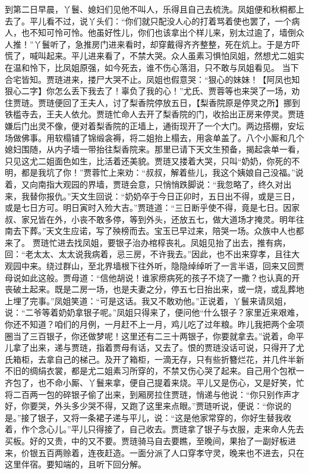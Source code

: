 \documentclass[12pt,oneside]{book}
\begin{document}
到第二日早晨，丫鬟、媳妇们见他不叫人，乐得且自己去梳洗。凤姐便和秋桐都上去了。平儿看不过，说丫头们：“你们就只配没人心的打着骂着使也罢了，一个病人，也不知可怜可怜。他虽好性儿，你们也该拿出个样儿来，别太过逾了，墙倒众人推！”丫鬟听了，急推房门进来看时，却穿戴得齐齐整整，死在炕上。于是方吓慌了，喊叫起来。平儿进来看了，不禁大哭。众人虽素习惧怕凤姐，然想尤二姐实在温和怜下，比凤姐原强，如今死去，谁不伤心落泪，只不敢与凤姐看见。
当下合宅皆知。贾琏进来，搂尸大哭不止。凤姐也假意哭：“狠心的妹妹！【阿凤也知狠心二字】你怎么丢下我去了！辜负了我的心！”尤氏、贾蓉等也来哭了一场，劝住贾琏。贾琏便回了王夫人，讨了梨香院停放五日，【梨香院原是停灵之所】挪到铁槛寺去，王夫人依允。贾琏忙命人去开了梨香院的门，收拾出正房来停灵。贾琏嫌后门出灵不像，便对着梨香院的正墙上，通街现开了一个大门。两边搭棚，安坛场做佛事。用软榻铺了锦缎衾褥，将二姐抬上榻去，用衾单盖了。八个小厮和几个媳妇围随，从内子墙一带抬往梨香院来。那里已请下天文生预备，揭起衾单一看，只见这尤二姐面色如生，比活着还美貌。贾琏又搂着大哭，只叫“奶奶，你死的不明，都是我坑了你！”贾蓉忙上来劝：“叔叔，解着些儿，我这个姨娘自己没福。”说着，又向南指大观园的界墙，贾琏会意，只悄悄跌脚说：“我忽略了，终久对出来，我替你报仇。”天文生回说：“奶奶卒于今日正卯时，五日出不得，或是三日，或是七日方可。明日寅时入殓大吉。”贾琏道：“三日断乎使不得，竟是七日。因家叔、家兄皆在外，小丧不敢多停，等到外头，还放五七，做大道场才掩灵。明年往南去下葬。”天文生应诺，写了殃榜而去。宝玉已早过来，陪哭一场。众族中人也都来了。
贾琏忙进去找凤姐，要银子治办棺椁丧礼。凤姐见抬了出去，推有病，回：“老太太、太太说我病着，忌三房，不许我去。”因此，也不出来穿孝，且往大观园中来。绕过群山，至北界墙根下往外听，隐隐绰绰听了一言半语，回来又回贾母说如此这般。贾母道：“信他胡说！谁家痨病死的孩子不烧了一撒？也认真的开丧破土起来。既是二房一场，也是夫妻之分，停五七日抬出来，或一烧，或乱葬地上埋了完事。”凤姐笑道：“可是这话。我又不敢劝他。”正说着，丫鬟来请凤姐，说：“二爷等着奶奶拿银子呢。”凤姐只得来了，便问他“什么银子？家里近来艰难，你还不知道？咱们的月例，一月赶不上一月，鸡儿吃了过年粮。昨儿我把两个金项圈当了三百银子，你还做梦呢！这里还有二三十两银子，你要就拿去。”说着，命平儿拿了出来，递与贾琏，指着贾母有话，又去了。恨的贾琏没话可说，只得开了尤氏箱柜，去拿自己的梯己。及开了箱柜，一滴无存，只有些折簪烂花，并几件半新不旧的绸绢衣裳，都是尤二姐素习所穿的，不禁又伤心哭了起来。自己用个包袱一齐包了，也不命小厮、丫鬟来拿，便自己提着来烧。平儿又是伤心，又是好笑，忙将二百两一包的碎银子偷了出来，到厢房拉住贾琏，悄递与他说：“你只别作声才好，你要哭，外头多少哭不得，又跑了这里来点眼。”贾琏听说，便说：“你说的是。”接了银子，又将一条裙子递与平儿，说：“这是他家常穿的，你好生替我收着，作个念心儿。”平儿只得接了，自己收去。贾琏拿了银子与衣服，走来命人先去买板。好的又贵，中的又不要。贾琏骑马自去要瞧，至晚间，果抬了一副好板进来，价银五百两赊着，连夜赶造。一面分派了人口穿孝守灵，晚来也不进去，只在这里伴宿。要知端的，且听下回分解。
\end{document}
